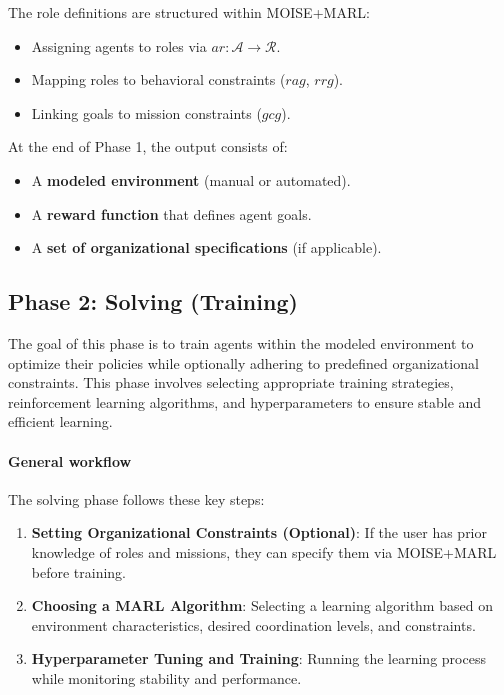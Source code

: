 \documentclass[pdflatex,sn-mathphys-num]{sn-jnl}%
\theoremstyle{thmstyleone}%
\theoremstyle{thmstyletwo}%
\theoremstyle{thmstylethree}%
\begin{document}
The role definitions are structured within MOISE+MARL:
\begin{itemize}
    \item Assigning agents to roles via $ar: \mathcal{A} \to \mathcal{R}$.
    \item Mapping roles to behavioral constraints ($rag$, $rrg$).
    \item Linking goals to mission constraints ($gcg$).
\end{itemize}

At the end of Phase 1, the output consists of:
\begin{itemize}
    \item A \textbf{modeled environment} (manual or automated).
    \item A \textbf{reward function} that defines agent goals.
    \item A \textbf{set of organizational specifications} (if applicable).
\end{itemize}


\subsection{Phase 2: Solving (Training)}

The goal of this phase is to train agents within the modeled environment to optimize their policies while optionally adhering to predefined organizational constraints. This phase involves selecting appropriate training strategies, reinforcement learning algorithms, and hyperparameters to ensure stable and efficient learning.

\paragraph{\textbf{General workflow}}
The solving phase follows these key steps:
\begin{enumerate}
    \item \textbf{Setting Organizational Constraints (Optional)}: If the user has prior knowledge of roles and missions, they can specify them via MOISE+MARL before training.
    \item \textbf{Choosing a MARL Algorithm}: Selecting a learning algorithm based on environment characteristics, desired coordination levels, and constraints.
    \item \textbf{Hyperparameter Tuning and Training}: Running the learning process while monitoring stability and performance.
\end{enumerate}
\end{document}
